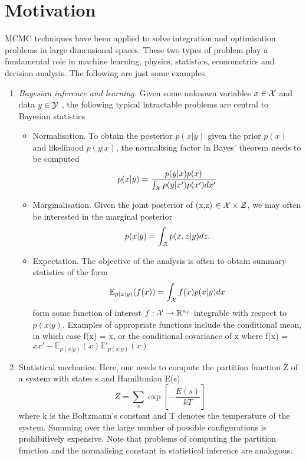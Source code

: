 \section{Motivation}
MCMC techniques have been applied to solve integration and optimisation problems in large dimensional spaces.
These two types of problem play a fundamental role in machine learning, physics, statistics, econometrics and decision
analysis. The following are just some examples. 
\begin{enumerate}
 \item \textit{Bayesian inference and learning.} 
Given some unknown variables $x \in \mathcal{X}$ and data $y \in \mathcal{Y}$
, the following typical intractable problems are central to Bayesian statistics
\begin{itemize}
 \item Normalisation. To obtain the posterior $p(x | y)$ given the prior $p(x)$ and likelihood $p(y | x)$,
the normalising factor in Bayes' theorem needs to be computed 
\begin{equation*}
 p(x | y) = \dfrac{p(y |x) p(x)}{\int_{\mathcal{X}} p(y | x') p(x') dx'}
\end{equation*}
\item Marginalisation. Given the joint posterior of (x,z) $\in \mathcal{X} \times \mathcal{Z}$, we may often be interested in the 
marginal posterior 
\begin{equation*}
 p(x | y) = \int_{\mathcal{Z}} p(x,z | y)dz.
\end{equation*}
\item Expectation. The objective of the analysis is often to obtain summary statistics of the form
\begin{equation}
 \mathbb{E}_{p(x | y)}(f(x)) = \int_{\mathcal{X}} f(x) p(x | y) dx
\end{equation}
form some function of interest $f: \mathcal{X} \rightarrow \mathbb{R}^{n_{f}}$ integrable with respect to $p(x | y)$. Examples
of appropriate functions include the conditional mean, in which case f(x) = x, or the conditional covariance of x where f(x) = $xx'
- \mathbb{E}_{p(x|y)}(x) \mathbb{E}'_{p(x|y)}(x)$
\end{itemize}
\item Statistical mechanics. Here, one needs to compute the partition function Z of a system with states s and 
Hamiltonian E(s) 
\begin{equation}
 Z = \sum_{s} \exp\left[ - \dfrac{E(s)}{kT}\right]
\end{equation}
where k is the Boltzmann's constant and T denotes the temperature of the system. Summing over the large number
of possible configurations is prohibitively expensive. Note that problems of computing the partition function and the normalising
constant in statistical inference are analogous. 
\end{enumerate}
